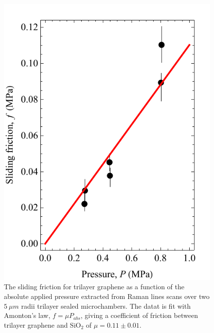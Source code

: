 \begin{figure}
	\begin{center}
	\includegraphics{Figs_Friction/Tri_mu.pdf}
	\end{center}
	\caption[The sliding friction for trilayer graphene]{\label{fig:fri:trimu}
	The sliding friction for trilayer graphene as a function of the absolute applied pressure extracted from Raman lines scans over two $5 \ \mu m$ radii trilayer sealed microchambers.
	The datat is fit with Amonton's law, $f=\mu P_{abs}$, giving a coefficient of friction between trilayer graphene and $\mathrm{SiO_2}$ of $\mu=0.11 \pm 0.01$. }
\end{figure}

